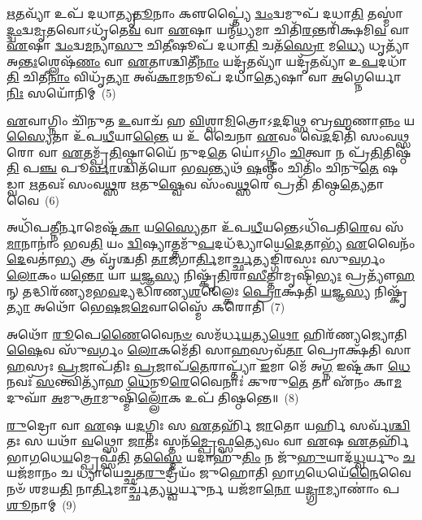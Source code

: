 \-\ul{𑌋}\-\-\ul{𑌤}\-𑌵𑍍𑌯𑌾᳴ 𑌉𑌪᳴ 𑌦𑌧𑌾𑌤𑍍𑌯𑍃\-\ul{𑌤𑍂}\-𑌨𑌾𑌂 𑌕𑍢𑌪𑍍𑌤𑍍𑌯𑍈॑ \ul{𑌦𑍍𑌵𑌂}\-𑌦𑍍𑌵𑌮𑍁𑌪᳴ 𑌦𑌧𑌾\-\ul{𑌤𑌿} 𑌤𑌸𑍍𑌮𑌾॑\-\ul{𑌦𑍍𑌦𑍍𑌵𑌂}\-𑌦𑍍𑌵\-\ul{𑌮𑍃}\-𑌤𑌵𑍋\-𑌽𑌧𑍃᳴𑌤𑍇\-\ul{𑌵} 𑌵𑌾 \ul{𑌏}\-𑌷𑌾 𑌯𑌨𑍍𑌮᳴\-\ul{𑌧𑍍𑌯}\-𑌮𑌾 𑌚𑌿𑌤𑌿᳴\-\ul{𑌰}\-𑌨𑍍𑌤𑌰𑌿᳴𑌕𑍍𑌷𑌮𑌿\-\ul{𑌵} 𑌵𑌾 \ul{𑌏}\-𑌷𑌾 \ul{𑌦𑍍𑌵𑌂}\-𑌦𑍍𑌵\-\ul{𑌮}\-𑌨𑍍𑌯𑌾\-\ul{𑌸𑍁} 𑌚𑌿\-\ul{𑌤𑍀}\-𑌷𑍂𑌪᳴ 𑌦𑌧𑌾\-\ul{𑌤𑌿} 𑌚𑌤᳴\-\ul{𑌸𑍍𑌰𑍋} 𑌮\-\ul{𑌧𑍍𑌯𑍇} 𑌧𑍃𑌤𑍍𑌯𑌾᳴ 𑌅\-\ul{𑌨𑍍𑌤𑌃}\-𑌶𑍍𑌲𑍇𑌷᳴\-\ul{𑌣𑌂} 𑌵𑌾 \ul{𑌏}\-𑌤𑌾𑌶𑍍𑌚𑌿𑌤𑍀᳴\-\ul{𑌨𑌾𑌂} 𑌯𑌦𑍃᳴\-\ul{𑌤}\-𑌵𑍍𑌯𑌾᳴ 𑌯𑌦𑍃᳴\-\ul{𑌤}\-𑌵𑍍𑌯𑌾᳴ 𑌉\-\ul{𑌪}\-𑌦𑌧𑌾᳴\-\ul{𑌤𑌿} 𑌚𑌿𑌤𑍀\-\ul{𑌨𑌾𑌂} 𑌵𑌿𑌧𑍃᳴\-\ul{𑌤𑍍𑌯𑌾} 𑌅𑌵᳴\-\ul{𑌕𑌾}\-𑌮𑌨𑍂𑌪᳴ 𑌦𑌧𑌾\-\ul{𑌤𑍍𑌯𑍇}\-𑌷𑌾 𑌵𑌾 \ul{𑌅}\-𑌗𑍍𑌨𑍇𑌰𑍍𑌯𑍋\-\ul{𑌨𑌿𑌃} 𑌸𑌯𑍋᳴𑌨𑌿𑌮𑍍~(5)

\-\ul{𑌏}\-𑌵𑌾𑌗𑍍𑌨𑌿𑌂 𑌚𑌿᳴𑌨𑍁𑌤 \ul{𑌉}\-𑌵𑌾𑌚᳴ 𑌹 \ul{𑌵𑌿}\-𑌶𑍍𑌵𑌾\-\ul{𑌮𑌿}\-𑌤𑍍𑌰𑍋\-𑌽\-\ul{𑌦}\-𑌦𑌿𑌥𑍍𑌸 𑌬𑍍𑌰\-\ul{𑌹𑍍𑌮}\-𑌣𑌾\-\ul{𑌨𑍍𑌨𑌂} 𑌯\-\ul{𑌸𑍍𑌯𑍈}\-𑌤𑌾 𑌉᳴𑌪\-\ul{𑌧𑍀}\-𑌯𑌾\-\ul{𑌨𑍍𑌤𑍈} 𑌯 𑌉᳴ 𑌚𑍈𑌨𑌾 \ul{𑌏}\-𑌵𑌂 𑌵𑍇\-\ul{𑌦}\-𑌦𑌿𑌤𑌿᳴ 𑌸𑌂𑌵\-\ul{𑌥𑍍𑌸}\-𑌰𑍋 𑌵𑌾 \ul{𑌏}\-𑌤𑌮𑍍𑌪𑍍𑌰᳴\-\ul{𑌤𑌿}\-𑌷𑍍𑌠𑌾𑌯𑍈᳴ 𑌨𑍁𑌦\-\ul{𑌤𑍇} 𑌯𑍋॑\-𑌽𑌗𑍍𑌨𑌿𑌂 \ul{𑌚𑌿}\-𑌤𑍍𑌵𑌾 𑌨 𑌪𑍍𑌰᳴\-\ul{𑌤𑌿}\-𑌤𑌿𑌷𑍍𑌠᳴\-\ul{𑌤𑌿} 𑌪\-\ul{𑌞𑍍𑌚} 𑌪𑍂\-\ul{𑌰𑍍𑌵𑌾}\-𑌶𑍍𑌚𑌿𑌤᳴𑌯𑍋 𑌭\-\ul{𑌵}\-𑌨𑍍𑌤𑍍𑌯𑌥᳴ \ul{𑌷}\-𑌷𑍍𑌠𑍀𑌂 𑌚𑌿𑌤𑌿𑌂᳴ 𑌚𑌿𑌨𑍁\-\ul{𑌤𑍇} 𑌷𑌡𑍍𑌵𑌾 \ul{𑌋}\-𑌤𑌵𑌃᳴ 𑌸𑌂𑌵\-\ul{𑌥𑍍𑌸}\-𑌰 \ul{𑌋}\-𑌤𑍁\-\ul{𑌷𑍍𑌵𑍇}\-𑌵 𑌸𑌂᳴𑌵\-\ul{𑌥𑍍𑌸}\-𑌰𑍇 𑌪𑍍𑌰𑌤𑌿᳴ 𑌤𑌿𑌷𑍍𑌠\-\ul{𑌤𑍍𑌯𑍇}\-𑌤𑌾 𑌵𑍈~(6)

𑌅𑌧𑌿᳴𑌪\-\ul{𑌤𑍍𑌨𑍀}\-𑌰𑍍𑌨𑌾𑌮𑍇𑌷𑍍𑌟᳴\-\ul{𑌕𑌾} 𑌯\-\ul{𑌸𑍍𑌯𑍈}\-𑌤𑌾 𑌉᳴𑌪\-\ul{𑌧𑍀}\-𑌯𑌨𑍍𑌤𑍇\-𑌽𑌧𑌿᳴𑌪𑌤𑌿\-\ul{𑌰𑍇}\-𑌵 𑌸᳴\-\ul{𑌮𑌾}\-𑌨𑌾𑌨𑌾𑌂॑ 𑌭𑌵\-\ul{𑌤𑌿} 𑌯𑌂 \ul{𑌦𑍍𑌵𑌿}\-𑌷𑍍𑌯𑌾𑌤𑍍𑌤𑌮𑍁᳴\-\ul{𑌪}\-𑌦𑌧᳴𑌦𑍍𑌧𑍍𑌯𑌾𑌯𑍇\-\ul{𑌦𑍇}\-𑌤𑌾𑌭𑍍𑌯᳴ \ul{𑌏}\-𑌵𑍈𑌨𑌂᳴ \ul{𑌦𑍇}\-𑌵𑌤𑌾॑\-\ul{𑌭𑍍𑌯} 𑌆 𑌵𑍃᳴𑌶𑍍𑌚𑌤𑌿 \ul{𑌤𑌾}\-𑌜𑌗𑌾\-\ul{𑌰𑍍𑌤𑌿}\-𑌮𑌾\-\ul{𑌰𑍍𑌚𑍍𑌛}\-𑌤𑍍𑌯𑌙𑍍𑌗𑌿᳴𑌰𑌸𑌃 𑌸𑍁\-\ul{𑌵}\-𑌰𑍍𑌗𑌂 \ul{𑌲𑍋}\-𑌕𑌂 𑌯\-\ul{𑌨𑍍𑌤𑍋} 𑌯𑌾 \ul{𑌯}\-𑌜𑍍𑌞\-\ul{𑌸𑍍𑌯} 𑌨𑌿𑌷𑍍𑌕𑍃᳴\-\ul{𑌤𑌿}\-𑌰𑌾\-\ul{𑌸𑍀}\-𑌤𑍍𑌤𑌾𑌮𑍃𑌷𑌿᳴\-\ul{𑌭𑍍𑌯𑌃} 𑌪𑍍𑌰𑌤𑍍𑌯𑍗᳴\-\ul{𑌹}\-𑌨𑍍 𑌤𑌦𑍍𑌧𑌿𑌰᳴𑌣𑍍𑌯𑌮𑌭\-\ul{𑌵}\-𑌦𑍍𑌯𑌦𑍍𑌧𑌿᳴𑌰𑌣𑍍𑌯\-\ul{𑌶}\-𑌲𑍍𑌕𑍈𑌃 \ul{𑌪𑍍𑌰𑍋}\-𑌕𑍍𑌷𑌤𑌿᳴ \ul{𑌯}\-𑌜𑍍𑌞\-\ul{𑌸𑍍𑌯} 𑌨𑌿𑌷𑍍𑌕𑍃᳴\-\ul{𑌤𑍍𑌯𑌾} 𑌅𑌥𑍋᳴ 𑌭𑍇\-\ul{𑌷}\-𑌜\-\ul{𑌮𑍇}\-𑌵𑌾𑌸𑍍𑌮𑍈᳴ 𑌕𑌰𑍋𑌤𑌿~(7)

𑌅𑌥𑍋᳴ \ul{𑌰𑍂}\-𑌪𑍇\-\ul{𑌣𑍈}\-𑌵𑍈\-\ul{𑌨}\-\-\ul{𑍞} 𑌸𑌮᳴𑌰𑍍𑌧\-\ul{𑌯}\-𑌤𑍍𑌯\-\ul{𑌥𑍋} 𑌹𑌿𑌰᳴𑌣𑍍𑌯𑌜𑍍𑌯𑍋𑌤𑌿\-\ul{𑌷𑍈}\-𑌵 𑌸𑍁᳴\-\ul{𑌵}\-𑌰𑍍𑌗𑌂 \ul{𑌲𑍋}\-𑌕𑌮𑍇᳴𑌤𑌿 𑌸𑌾\-\ul{𑌹}\-𑌸𑍍𑌰𑌵᳴\-\ul{𑌤𑌾} 𑌪𑍍𑌰𑍋𑌕𑍍𑌷᳴𑌤𑌿 𑌸𑌾\-\ul{𑌹}\-𑌸𑍍𑌰𑌃 \ul{𑌪𑍍𑌰}\-𑌜𑌾𑌪᳴𑌤𑌿𑌃 \ul{𑌪𑍍𑌰}\-𑌜𑌾𑌪᳴\-\ul{𑌤𑍇}\-𑌰𑌾𑌪𑍍𑌤𑍍𑌯𑌾᳴ \ul{𑌇}\-𑌮𑌾 𑌮𑍇᳴ 𑌅\-\ul{𑌗𑍍𑌨} 𑌇𑌷𑍍𑌟᳴𑌕𑌾 \ul{𑌧𑍇}\-𑌨𑌵𑌃᳴ \ul{𑌸}\-𑌨𑍍𑌤𑍍𑌵𑌿𑌤𑍍𑌯𑌾᳴𑌹 \ul{𑌧𑍇}\-𑌨𑍂\-\ul{𑌰𑍇}\-𑌵𑍈𑌨𑌾𑌃॑ 𑌕𑍁𑌰𑍁\-\ul{𑌤𑍇} 𑌤𑌾 𑌏᳴𑌨𑌂 𑌕𑌾\-\ul{𑌮}\-𑌦𑍁𑌘𑌾᳴ \ul{𑌅}\-𑌮𑍁\-\ul{𑌤𑍍𑌰𑌾}\-𑌮𑍁𑌷𑍍𑌮𑌿᳴\-\ul{𑌲𑍍𑌲𑍋𑌁}\-𑌕 𑌉𑌪᳴ 𑌤𑌿𑌷𑍍𑌠𑌨𑍍𑌤𑍇॥~(8)

{\anuvakamend[{𑌸𑌯𑍋᳴𑌨𑌿\-\ul{𑌮𑍇}\-𑌤𑌾 𑌵𑍈 𑌕᳴\-\ul{𑌰𑍋}\-𑌤𑍍𑌯𑍇\-\ul{𑌕𑌾}\-𑌨𑍍𑌨𑌚᳴𑌤𑍍𑌵𑌾\-\ul{𑌰𑌿}\-\-\ul{𑍞}\-𑌶𑌚𑍍𑌚᳴}]}%

\-\ul{𑌰𑍁}\-𑌦𑍍𑌰𑍋 𑌵𑌾 \ul{𑌏}\-𑌷 𑌯\-\ul{𑌦}\-𑌗𑍍𑌨𑌿𑌃 𑌸 \ul{𑌏}\-𑌤𑌰𑍍\mbox{}𑌹𑌿᳴ \ul{𑌜𑌾}\-𑌤𑍋 𑌯𑌰𑍍\mbox{}\-\ul{𑌹𑌿} 𑌸𑌰𑍍𑌵᳴\-\ul{𑌶𑍍𑌚𑌿}\-𑌤𑌃 𑌸 𑌯𑌥𑌾᳴ \ul{𑌵}\-𑌥𑍍𑌸𑍋 \ul{𑌜𑌾}\-𑌤𑌃 𑌸𑍍𑌤𑌨᳴\-\ul{𑌮𑍍𑌪𑍍𑌰𑍇}\-𑌫𑍍𑌸\-\ul{𑌤𑍍𑌯𑍇}\-𑌵𑌂 𑌵𑌾 \ul{𑌏}\-𑌷 \ul{𑌏}\-𑌤𑌰𑍍\mbox{}𑌹𑌿᳴ 𑌭𑌾\-\ul{𑌗}\-𑌧𑍇\-\ul{𑌯}\-𑌮𑍍𑌪𑍍𑌰𑍇𑌫𑍍𑌸᳴\-\ul{𑌤𑌿} 𑌤\-\ul{𑌸𑍍𑌮𑍈} 𑌯𑌦𑌾𑌹𑍁᳴\-\ul{𑌤𑌿𑌂} 𑌨 𑌜𑍁᳴\-\ul{𑌹𑍁}\-𑌯𑌾𑌦᳴\-\ul{𑌧𑍍𑌵}\-𑌰𑍍𑌯𑍁𑌂 \ul{𑌚} 𑌯𑌜᳴𑌮𑌾𑌨𑌂 𑌚 𑌧𑍍𑌯𑌾𑌯𑍇𑌚𑍍𑌛𑌤\-\ul{𑌰𑍁}\-𑌦𑍍𑌰𑍀𑌯𑌂᳴ 𑌜𑍁𑌹𑍋𑌤𑌿 𑌭𑌾\-\ul{𑌗}\-𑌧𑍇𑌯𑍇᳴\-\ul{𑌨𑍈}\-𑌵𑍈𑌨𑍞᳴ 𑌶𑌮𑌯\-\ul{𑌤𑌿} 𑌨𑌾\-\ul{𑌰𑍍𑌤𑌿}\-𑌮𑌾𑌰𑍍𑌚𑍍𑌛᳴𑌤𑍍𑌯\-\ul{𑌧𑍍𑌵}\-𑌰𑍍𑌯𑍁𑌰𑍍𑌨 𑌯𑌜᳴𑌮𑌾\-\ul{𑌨𑍋} 𑌯\-\ul{𑌦𑍍𑌗𑍍𑌰𑌾}\-𑌮𑍍𑌯𑌾𑌣𑌾𑌂॑ 𑌪\-\ul{𑌶𑍂}\-𑌨𑌾𑌮𑍍~(9)

